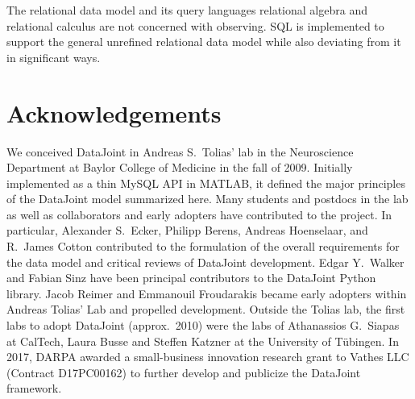\documentclass[letter,10pt]{article}
\begin{document}
The relational data model and its query languages relational algebra and relational calculus are not concerned with observing. 
SQL is implemented to support the general unrefined relational data model while also deviating from it in significant ways. 

\section{Acknowledgements}
We conceived DataJoint in Andreas S.\ Tolias' lab in the Neuroscience Department at Baylor College of Medicine in the fall of 2009. 
Initially implemented as a thin MySQL API in MATLAB, it defined the major principles of the DataJoint model summarized here. 
Many students and postdocs in the lab as well as collaborators and early adopters have contributed to the project.
In particular, Alexander S.\ Ecker, Philipp Berens, Andreas Hoenselaar, and R.\ James Cotton contributed to the formulation of the overall requirements for the data model and critical reviews of DataJoint development.
Edgar Y.\ Walker and Fabian Sinz have been principal contributors to the DataJoint Python library. 
Jacob Reimer and Emmanouil Froudarakis became early adopters within Andreas Tolias' Lab and propelled development.
Outside the Tolias lab, the first labs to adopt DataJoint (approx.\ 2010) were the labs of Athanassios G.\ Siapas at CalTech, Laura Busse and Steffen Katzner at the University of T\"ubingen.
In 2017, DARPA awarded a small-business innovation research grant to Vathes LLC (Contract D17PC00162) to further develop and publicize the DataJoint framework. 






\end{document}

